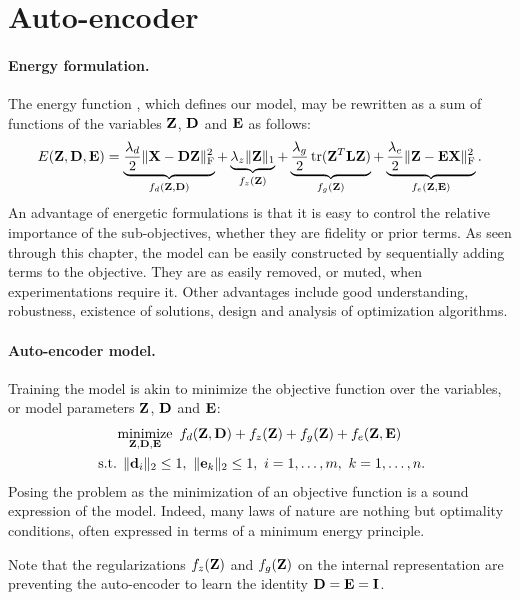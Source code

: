 \section{Auto-encoder}

\paragraph{Energy formulation.}
The energy function , which defines our model, may be rewritten as a sum of functions of the variables $\mathbf{Z}$, $\mathbf{D}$ and $\mathbf{E}$ as follows:
\begin{equation} \label{eqn:objective}
	E(\mathbf{Z}, \mathbf{D}, \mathbf{E}) =
	\underbrace{\frac{\lambda_d}{2} \| \mathbf{X} - \mathbf{D} \mathbf{Z} \|_\text{F}^2}_{f_d(\mathbf{Z}, \mathbf{D})} +
	\underbrace{\lambda_z \| \mathbf{Z} \|_1}_{f_z(\mathbf{Z})} +
	\underbrace{\frac{\lambda_g}{2} \operatorname*{tr}(\mathbf{Z}^T \mathbf{L} \mathbf{Z})}_{f_g(\mathbf{Z})} +
	\underbrace{\frac{\lambda_e}{2} \| \mathbf{Z} - \mathbf{E} \mathbf{X} \|_\text{F}^2}_{f_e(\mathbf{Z}, \mathbf{E})}.
\end{equation}
An advantage of energetic formulations is that it is easy to control the relative importance of the sub-objectives, whether they are fidelity or prior terms. As seen through this chapter, the model can be easily constructed by sequentially adding terms to the objective. They are as easily removed, or muted, when experimentations require it. Other advantages include good understanding, robustness, existence of solutions, design and analysis of optimization algorithms.

\paragraph{Auto-encoder model.}
Training the model is akin to minimize the objective function  over the variables, or model parameters $\mathbf{Z}$, $\mathbf{D}$ and $\mathbf{E}$:
\begin{multline} \label{eqn:model}
	\operatorname*{minimize}\limits_{\mathbf{Z},\mathbf{D},\mathbf{E}} \  f_d(\mathbf{Z}, \mathbf{D}) + f_z(\mathbf{Z}) + f_g(\mathbf{Z}) + f_e(\mathbf{Z}, \mathbf{E}) \\
	\text{ s.t. } \|\mathbf{d}_i\|_2 \leq 1 ,\ \|\mathbf{e}_k\|_2 \leq 1 ,\ i = 1, \ldots, m ,\ k = 1, \ldots, n.
\end{multline}
Posing the problem as the minimization of an objective function is a sound expression of the model. Indeed, many laws of nature are nothing but optimality conditions, often expressed in terms of a minimum energy principle.

Note that the regularizations $f_z(\mathbf{Z})$ and $f_g(\mathbf{Z})$ on the internal representation are preventing the auto-encoder to learn the identity $\mathbf{D} = \mathbf{E} = \mathbf{I}$.

